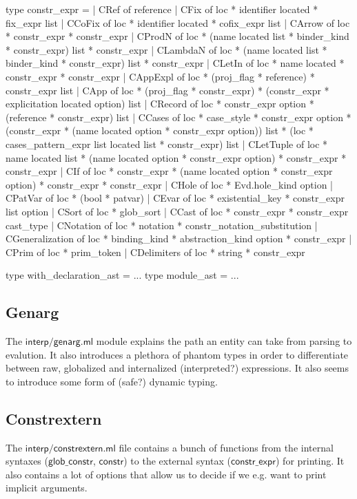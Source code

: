 \documentclass[a4paper,oneside]{book}
\newcommand{\m}[1]{\ensuremath{\mathsf{#1}}}
\begin{document}
\begin{code}
type constr_expr =
  | CRef of reference
  | CFix of loc * identifier located * fix_expr list
  | CCoFix of loc * identifier located * cofix_expr list
  | CArrow of loc * constr_expr * constr_expr
  | CProdN of loc * (name located list * binder_kind * constr_expr) list * constr_expr
  | CLambdaN of loc * (name located list * binder_kind * constr_expr) list * constr_expr
  | CLetIn of loc * name located * constr_expr * constr_expr
  | CAppExpl of loc * (proj_flag * reference) * constr_expr list
  | CApp of loc * (proj_flag * constr_expr) *
      (constr_expr * explicitation located option) list
  | CRecord of loc * constr_expr option * (reference * constr_expr) list
  | CCases of loc * case_style * constr_expr option *
      (constr_expr * (name located option * constr_expr option)) list *
      (loc * cases_pattern_expr list located list * constr_expr) list
  | CLetTuple of loc * name located list * (name located option * constr_expr option) *
      constr_expr * constr_expr
  | CIf of loc * constr_expr * (name located option * constr_expr option)
      * constr_expr * constr_expr
  | CHole of loc * Evd.hole_kind option
  | CPatVar of loc * (bool * patvar)
  | CEvar of loc * existential_key * constr_expr list option
  | CSort of loc * glob_sort
  | CCast of loc * constr_expr * constr_expr cast_type
  | CNotation of loc * notation * constr_notation_substitution
  | CGeneralization of loc * binding_kind * abstraction_kind option * constr_expr
  | CPrim of loc * prim_token
  | CDelimiters of loc * string * constr_expr

type with_declaration_ast = ...
type module_ast = ...
\end{code}

\subsection{Genarg}

The \m{interp/genarg.ml} module explains the path an entity can take
from parsing to evalution. It also introduces a plethora of phantom
types in order to differentiate between raw, globalized and
internalized (interpreted?) expressions. It also seems to introduce
some form of (safe?) dynamic typing.

\subsection{Constrextern}

The \m{interp/constrextern.ml} file contains a bunch of functions from
the internal syntaxes (\m{glob\_constr}, \m{constr}) to the external
syntax (\m{constr\_expr}) for printing. It also contains a lot of
options that allow us to decide if we e.g. want to print implicit
arguments.
\end{document}
